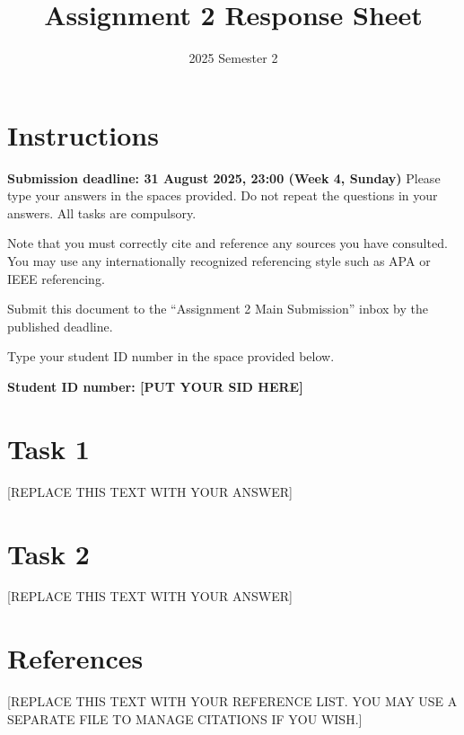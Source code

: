 \documentclass{article}
\title{Assignment 2 Response Sheet}
\date{2025 Semester 2}
\begin{document}
\maketitle

\section{Instructions}
\textbf{Submission deadline: 31 August 2025, 23:00 (Week 4, Sunday)}
Please type your answers in the spaces provided. Do not repeat the questions in your answers. All tasks are compulsory.

Note that you must correctly cite and reference any sources you have consulted. You may use any internationally recognized referencing style such as APA or IEEE referencing.

Submit this document to the ``Assignment 2 Main Submission'' inbox by the published deadline.

Type your student ID number in the space provided below.

\textbf{Student ID number: [PUT YOUR SID HERE]}

\section{Task 1}
[REPLACE THIS TEXT WITH YOUR ANSWER]

\section{Task 2}
[REPLACE THIS TEXT WITH YOUR ANSWER]



\newpage
\section{References}
[REPLACE THIS TEXT WITH YOUR REFERENCE LIST. YOU MAY USE A SEPARATE FILE TO MANAGE CITATIONS IF YOU WISH.]
\end{document}
